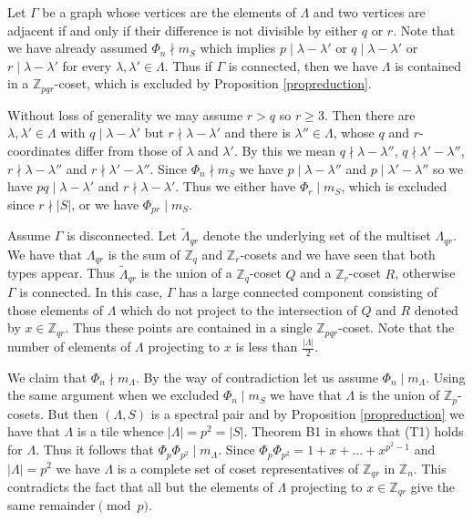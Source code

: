 \documentclass[10pt]{article}
\newcommand{\Z}{\mathbb{Z}}
\newcommand{\La}{\Lambda}
\newcommand{\la}{\lambda}
\begin{document}
        Let $\Gamma$ be a graph whose vertices are the elements of $\La$ and two vertices are adjacent if and only if their difference is not divisible by either $q$ or $r$. 
        Note that we have already assumed $\Phi_n \nmid m_S$ which implies $p \mid \lambda-\lambda '$ or $q \mid
        \lambda-\lambda '$ or $r \mid \lambda-\lambda '$ for every
        $\lambda, \lambda ' \in \Lambda$.
        Thus if $\Gamma$ is connected, then we have $\La$ is contained in a $\Z_{pqr}$-coset, which is excluded by Proposition \ref{propreduction}. 
        
        
        Without loss of generality we may assume $r>q$ so $r\ge 3$. 
        Then there are $\la, \la' \in  \La$ with  $q \mid \la-\la'$ but  $r \nmid \la-\la'$ and there is $\la'' \in \La$, whose $q$ and $r$-coordinates differ from those of $\la$ and $\la'$. By this we mean $q \nmid \la-\la''$, $q \nmid \la'-\la''$, $r \nmid \la-\la''$ and $r \nmid \la'-\la''$. 
        Since $\Phi_n \nmid m_S$ we have $p  \mid \la-\la''$ and $p  \mid \la'-\la''$ so we have $pq  \mid \la-\la'$ and $r \nmid \la-\la'$. 
        Thus we either have $\Phi_r \mid m_S$, which is excluded since $r \nmid |S|$, or we have $\Phi_{pr} \mid m_S$. 
        
        
        Assume $\Gamma$ is disconnected. Let $\tilde{\Lambda}_{qr}$ denote the underlying set of the multiset $\Lambda_{qr}$. We have that $\La_{qr}$ is the sum of $\Z_q$ and $\Z_r$-cosets and we have seen that  both types appear. Thus $\tilde{\La}_{qr}$ is the union of a $\Z_q$-coset $Q$ and a $\Z_r$-coset $R$, otherwise $\Gamma$ is connected. 
        In this case, $\Gamma$ has a large connected component consisting of those elements of $\La$ which do not project to the
        intersection of $Q$ and $R$ denoted by $x \in \Z_{qr}$. Thus these points are contained in a single $\Z_{pqr}$-coset. Note that the number of elements of $\La$ projecting to $x$ is less than $\frac{|\La|}{2}$.
        
        We claim that $\Phi_n \nmid m_{\La}$. By the way of contradiction let us assume $\Phi_n \mid m_{\La}$. Using the same argument when we excluded $\Phi_n \mid m_S$ we have that $\La$ is the union of $\Z_p$-cosets. But then $(\La,S)$ is a spectral pair and by Proposition \ref{propreduction} we have that $\La$ is a tile whence $|\La|=p^2=|S|$. 
         Theorem B1 in \cite{cm} shows that (T1) holds for $\La$. Thus it follows that $\Phi_p \Phi_{p^2} \mid m_{\La}$. Since $\Phi_p \Phi_{p^2}=1+x+ \ldots +x^{p^2-1}$ and $|\La|=p^2$ we have $\La$ is a complete set of coset representatives of $\Z_{qr}$ in $\Z_n$. This contradicts the fact that all but the elements of $\La$ projecting to $x \in \Z_{qr}$ give the same remainder$\pmod{p}$. 
        
\end{document}

